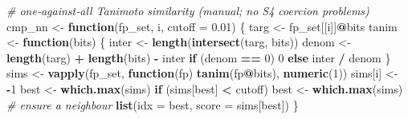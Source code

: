\documentclass[
]{article}
\newenvironment{Shaded}{\begin{snugshade}}{\end{snugshade}}
\newcommand{\AttributeTok}[1]{\textcolor[rgb]{0.13,0.29,0.53}{#1}}
\newcommand{\CommentTok}[1]{\textcolor[rgb]{0.56,0.35,0.01}{\textit{#1}}}
\newcommand{\ControlFlowTok}[1]{\textcolor[rgb]{0.13,0.29,0.53}{\textbf{#1}}}
\newcommand{\DecValTok}[1]{\textcolor[rgb]{0.00,0.00,0.81}{#1}}
\newcommand{\FloatTok}[1]{\textcolor[rgb]{0.00,0.00,0.81}{#1}}
\newcommand{\FunctionTok}[1]{\textcolor[rgb]{0.13,0.29,0.53}{\textbf{#1}}}
\newcommand{\NormalTok}[1]{#1}
\newcommand{\OtherTok}[1]{\textcolor[rgb]{0.56,0.35,0.01}{#1}}
\newcommand{\SpecialCharTok}[1]{\textcolor[rgb]{0.81,0.36,0.00}{\textbf{#1}}}
\begin{document}
\begin{Shaded}
\begin{Highlighting}[]
\CommentTok{\# one‑against‑all Tanimoto similarity (manual; no S4 coercion problems)}
\NormalTok{cmp\_nn }\OtherTok{\textless{}{-}} \ControlFlowTok{function}\NormalTok{(fp\_set, i, }\AttributeTok{cutoff =} \FloatTok{0.01}\NormalTok{) \{}
\NormalTok{  targ  }\OtherTok{\textless{}{-}}\NormalTok{ fp\_set[[i]]}\SpecialCharTok{@}\NormalTok{bits}
\NormalTok{  tanim }\OtherTok{\textless{}{-}} \ControlFlowTok{function}\NormalTok{(bits) \{}
\NormalTok{    inter }\OtherTok{\textless{}{-}} \FunctionTok{length}\NormalTok{(}\FunctionTok{intersect}\NormalTok{(targ, bits))}
\NormalTok{    denom }\OtherTok{\textless{}{-}} \FunctionTok{length}\NormalTok{(targ) }\SpecialCharTok{+} \FunctionTok{length}\NormalTok{(bits) }\SpecialCharTok{{-}}\NormalTok{ inter}
    \ControlFlowTok{if}\NormalTok{ (denom }\SpecialCharTok{==} \DecValTok{0}\NormalTok{) }\DecValTok{0} \ControlFlowTok{else}\NormalTok{ inter }\SpecialCharTok{/}\NormalTok{ denom}
\NormalTok{  \}}
\NormalTok{  sims }\OtherTok{\textless{}{-}} \FunctionTok{vapply}\NormalTok{(fp\_set, }\ControlFlowTok{function}\NormalTok{(fp) }\FunctionTok{tanim}\NormalTok{(fp}\SpecialCharTok{@}\NormalTok{bits), }\FunctionTok{numeric}\NormalTok{(}\DecValTok{1}\NormalTok{))}
\NormalTok{  sims[i] }\OtherTok{\textless{}{-}} \SpecialCharTok{{-}}\DecValTok{1}
\NormalTok{  best    }\OtherTok{\textless{}{-}} \FunctionTok{which.max}\NormalTok{(sims)}
  \ControlFlowTok{if}\NormalTok{ (sims[best] }\SpecialCharTok{\textless{}}\NormalTok{ cutoff) best }\OtherTok{\textless{}{-}} \FunctionTok{which.max}\NormalTok{(sims)  }\CommentTok{\# ensure a neighbour}
  \FunctionTok{list}\NormalTok{(}\AttributeTok{idx =}\NormalTok{ best, }\AttributeTok{score =}\NormalTok{ sims[best])}
\NormalTok{\}}
\end{Highlighting}
\end{Shaded}
\end{document}
